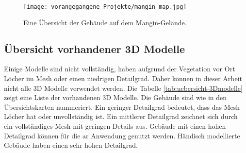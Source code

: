 \begin{figure}[h]
    \centering
    \texttt{[image: vorangegangene\_Projekte/mangin\_map.jpg]}
    \caption{Eine Übersicht der Gebäude auf dem Mangin-Gelände.}
    \label{fig:mangin-map}
\end{figure}
\subsection{Übersicht vorhandener 3D Modelle}
Einige Modelle sind nicht vollständig, haben aufgrund der Vegetation vor Ort Löcher im Mesh oder einen niedrigen Detailgrad. Daher können in dieser Arbeit nicht alle 3D Modelle verwendet werden. Die Tabelle \ref{tab:uebersicht-3Dmodelle} zeigt eine Liste der vorhandenen 3D Modelle. Die Gebäude sind wie in den Übersichtskarten nummeriert. Ein geringer Detailgrad bedeutet, dass das Mesh Löcher hat oder unvollständig ist. Ein mittlerer Detailgrad zeichnet sich durch ein vollständiges Mesh mit geringen Details aus. Gebäude mit einen hohen Detailgrad können für die \acrshort{ar} Anwendung genutzt werden. Händisch modellierte Gebäude haben einen sehr hohen Detailgrad.
